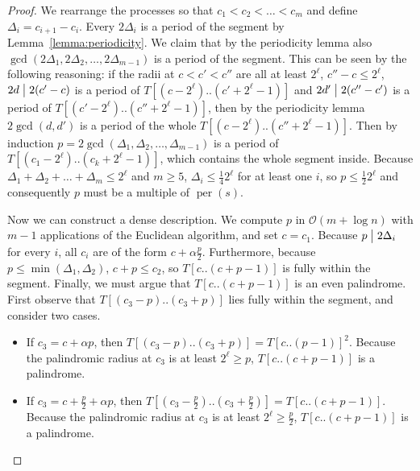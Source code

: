 \documentclass{article}[11pt,letter]
\newcommand{\bigo}{\mathcal{O}}
\newcommand{\divides}{\bigm|}
\DeclareMathOperator{\per}{per}
\newcommand{\kpers}{\ensuremath{p}}
\begin{document}
\begin{proof}
We rearrange the processes so that $c_{1}<c_{2}<\ldots<c_{m}$ and define $\Delta_{i}=c_{i+1}-c_{i}$. Every $2\Delta_{i}$ is a period of the segment
by Lemma~\ref{lemma:periodicity}. We claim that by the periodicity lemma also $\gcd(2\Delta_{1},2\Delta_{2},\ldots,2\Delta_{m-1})$ is a period of the 
segment. This can be seen by the following reasoning: if the radii at $c<c'<c''$ are all at least $2^{\ell}$, $c''-c\leq 2^{\ell}$, $2d \divides 2(c'-c)$ is a period of
$T[(c-2^{\ell})..(c'+2^{\ell}-1)]$ and $2d'\divides 2(c''-c')$ is a period of $T[(c'-2^{\ell})..(c''+2^{\ell}-1)]$, then by the periodicity lemma $2\gcd(d,d')$ is a
period of  the whole $T[(c-2^{\ell})..(c''+2^{\ell}-1)]$. Then by induction $\kpers=2\gcd(\Delta_{1},\Delta_{2},\ldots,\Delta_{m-1})$ is a period
of $T[(c_{1}-2^{\ell})..(c_{k}+2^{\ell}-1)]$, which contains the whole segment inside. Because $\Delta_{1}+\Delta_{2}+\ldots+\Delta_{m}\leq 2^{\ell}$
and $m\geq 5$,
$\Delta_{i} \leq \frac{1}{4}2^{\ell}$ for at least one $i$, so $\kpers\leq\frac{1}{2}2^{\ell}$ and consequently $\kpers$ must be a multiple of $\per(s)$.

Now we can construct a dense description. We compute $\kpers$ in $\bigo(m+\log n)$ with $m-1$ applications of the Euclidean algorithm,
and set $c=c_{1}$.
Because $\kpers\divides2\Delta_{i}$ for every $i$, all $c_{i}$ are of the form $c+\alpha\frac{\kpers}{2}$. Furthermore, because $\kpers\leq \min(\Delta_{1},\Delta_{2})$, 
$c+\kpers\leq c_{2}$, so $T[c..(c+\kpers-1)]$ is fully within the segment. Finally, we must argue that $T[c..(c+\kpers-1)]$ is an even palindrome.
First observe that $T[(c_{3}-\kpers)..(c_{3}+\kpers)]$ lies fully within the segment, and consider two cases.
\begin{itemize}
\item If $c_{3}=c+\alpha \kpers$, then $T[(c_{3}-\kpers)..(c_{3}+\kpers)]=T[c..(\kpers-1)]^{2}$. Because the palindromic radius at $c_{3}$ is at least $2^{\ell}\geq \kpers$,
$T[c..(c+\kpers-1)]$ is a palindrome.
\item If $c_{3}=c+\frac{\kpers}{2}+\alpha p$, then $T[(c_{3}-\frac{\kpers}{2})..(c_{3}+\frac{\kpers}{2})]=T[c..(c+\kpers-1)]$. Because the palindromic radius at $c_{3}$ is at least $2^{\ell}\geq \frac{\kpers}{2}$, $T[c..(c+\kpers-1)]$ is a palindrome.\qedhere
\end{itemize}
\end{proof}
\end{document}
